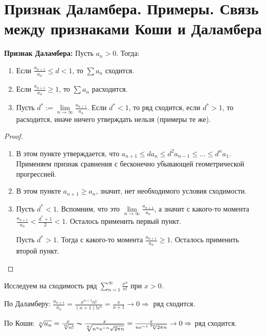 \section{Признак Даламбера. Примеры. Связь между признаками Коши и Даламбера}
\textbf{Признак Даламбера:} 
Пусть $a_n > 0$. Тогда: \begin{enumerate}
    \item Если $\frac{a_{n+1}}{a_n} \leqslant d < 1$, то $\sum a_n$ сходится.
    \item Если $\frac{a_{n+1}}{a_n} \geqslant 1$, то $\sum a_n$ расходится.
    \item Пусть $d^* := \lim\limits_{n \to \infty} \frac{a_{n+1}}{a_n}$. Если $d^* < 1$, то ряд сходится, если $d^* > 1$, то расходится, иначе ничего утверждать нельзя (примеры те же).
\end{enumerate}
\begin{proof} \quad

    \begin{enumerate}
        \item В этом пункте утверждается, что $a_{n+1} \leqslant da_n \leqslant d^2a_{n - 1} \leqslant \dots \leqslant d^na_1$. Применяем признак сравнения с бесконечно убывающей геометрической прогрессией.
        \item В этом пункте $a_{n+1} \geqslant a_n$, значит, нет необходимого условия сходимости.
        \item Пусть $d^* < 1$. Вспомним, что это $\lim\limits_{n \to \infty} \frac{a_{n+1}}{a_n}$, а значит с какого-то момента $\frac{a_{n+1}}{a_n} < \frac{d^* + 1}{2} < 1$. Осталось применить первый пункт.
        
        Пусть $d^* > 1$. Тогда с какого-то момента $\frac{a_{n+1}}{a_n} \geqslant 1$. Осталось применить второй пункт.
    \end{enumerate}
\end{proof}

\begin{example}
    Исследуем на сходимость ряд $\sum\limits_{n = 1}^\infty \frac{x^n}{n!}$ при $x > 0$.

    По Даламберу: $\frac{a_{n+1}}{a_n} = \frac{x^{n+1}n!}{(n+1)!x^n} = \frac{x}{n+1} \to 0 \Rightarrow$ ряд сходится.

    По Коши: $\sqrt[n]{a_n} = \frac{x}{\sqrt[n]{n!}} \thicksim \frac{x}{\sqrt[n]{n^ne^{-n}\sqrt{2\pi n}}} = \frac{x}{ne^{-1}\sqrt[2n]{2\pi n}} \to 0 \Rightarrow$ ряд сходится.
\end{example}

\vspace{5mm}


